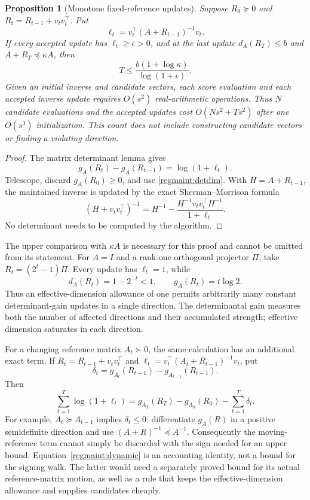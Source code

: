 \documentclass[11pt]{amsart}
\newtheorem{proposition}[theorem]{Proposition}
\theoremstyle{definition}\newtheorem{definition}[theorem]{Definition}
\theoremstyle{remark}\newtheorem{remark}[theorem]{Remark}
\numberwithin{equation}{section}
\begin{document}
\begin{proposition}[Monotone fixed-reference updates]
\label{regmaint:fixed}
Suppose $R_0\succeq0$ and
$R_t=R_{t-1}+v_tv_t^\top$.  Put
\[
 \ell_t=v_t^\top(A+R_{t-1})^{-1}v_t.
\]
If every accepted update has $\ell_t\ge\epsilon>0$, and at the
last update $d_A(R_T)\le b$ and $A+R_T\preceq\kappa A$, then
\begin{equation}\label{regmaint:count}
 T\le\frac{b(1+\log\kappa)}{\log(1+\epsilon)}.
\end{equation}
Given an initial inverse and candidate vectors, each score evaluation
and each accepted inverse update requires $O(s^2)$ real-arithmetic
operations.  Thus $N$ candidate evaluations and the accepted updates
cost $O(Ns^2+Ts^2)$ after one $O(s^3)$ initialization.  This count does
not include constructing candidate vectors or finding a violating
direction.
\end{proposition}
\begin{proof}
The matrix determinant lemma gives
\[
 g_A(R_t)-g_A(R_{t-1})=\log(1+\ell_t).
\]
Telescope, discard $g_A(R_0)\ge0$, and use
\eqref{regmaint:detdim}.  With $H=A+R_{t-1}$, the maintained inverse
is updated by the exact Sherman--Morrison formula
\[
 (H+v_tv_t^\top)^{-1}
 =H^{-1}-\frac{H^{-1}v_tv_t^\top H^{-1}}{1+\ell_t}.
\]
No determinant needs to be computed by the algorithm.
\end{proof}

The upper comparison with $\kappa A$ is necessary for this proof and
cannot be omitted from its statement.  For $A=I$ and a rank-one
orthogonal projector $\Pi$, take $R_t=(2^t-1)\Pi$.  Every update has
$\ell_t=1$, while
\[
 d_A(R_t)=1-2^{-t}<1,\qquad g_A(R_t)=t\log2.
\]
Thus an effective-dimension allowance of one permits arbitrarily many
constant determinant-gain updates in a single direction.  The
determinantal gain measures both the number of affected directions and
their accumulated strength; effective dimension saturates in each
direction.

For a changing reference matrix $A_t\succ0$, the same calculation has
an additional exact term.  If $R_t=R_{t-1}+v_tv_t^\top$ and
$\ell_t=v_t^\top(A_t+R_{t-1})^{-1}v_t$, put
\[
 \delta_t=g_{A_t}(R_{t-1})-g_{A_{t-1}}(R_{t-1}).
\]
Then
\begin{equation}\label{regmaint:dynamic}
 \sum_{t=1}^T\log(1+\ell_t)
 =g_{A_T}(R_T)-g_{A_0}(R_0)-\sum_{t=1}^T\delta_t.
\end{equation}
For example, $A_t\succeq A_{t-1}$ implies $\delta_t\le0$:
differentiate $g_A(R)$ in a positive semidefinite direction and use
$(A+R)^{-1}\preceq A^{-1}$.  Consequently the moving-reference term
cannot simply be discarded with the sign needed for an upper bound.
Equation~\eqref{regmaint:dynamic} is an accounting identity, not a
bound for the signing walk.  The latter would need a separately proved
bound for its actual reference-matrix motion, as well as a rule that
keeps the effective-dimension allowance and supplies candidates cheaply.
\end{document}
